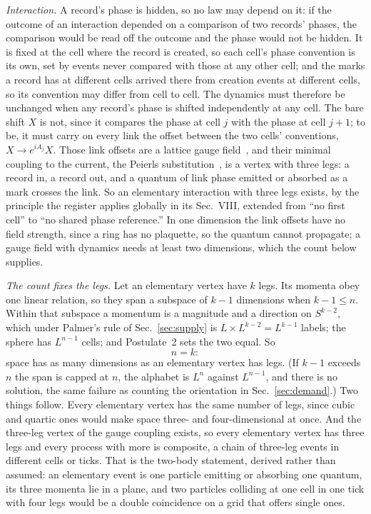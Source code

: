 \documentclass[aps,prd,twocolumn,superscriptaddress,nofootinbib]{revtex4-2}
\begin{document}
\textit{Interaction.} A record's phase is hidden, so no law may depend on it: if the outcome of an interaction depended on a comparison of two records' phases, the comparison would be read off the outcome and the phase would not be hidden. It is fixed at the cell where the record is created, so each cell's phase convention is its own, set by events never compared with those at any other cell; and the marks a record has at different cells arrived there from creation events at different cells, so its convention may differ from cell to cell. The dynamics must therefore be unchanged when any record's phase is shifted independently at any cell. The bare shift $X$ is not, since it compares the phase at cell $j$ with the phase at cell $j+1$; to be, it must carry on every link the offset between the two cells' conventions, $X \to e^{iA_j}X$. Those link offsets are a lattice gauge field~\cite{wilson1974}, and their minimal coupling to the current, the Peierls substitution~\cite{peierls1933}, is a vertex with three legs: a record in, a record out, and a quantum of link phase emitted or absorbed as a mark crosses the link. So an elementary interaction with three legs exists, by the principle the register applies globally in its Sec.~VIII, extended from ``no first cell'' to ``no shared phase reference.'' In one dimension the link offsets have no field strength, since a ring has no plaquette, so the quantum cannot propagate; a gauge field with dynamics needs at least two dimensions, which the count below supplies.

\textit{The count fixes the legs.} Let an elementary vertex have $k$ legs. Its momenta obey one linear relation, so they span a subspace of $k-1$ dimensions when $k-1 \le n$. Within that subspace a momentum is a magnitude and a direction on $S^{k-2}$, which under Palmer's rule of Sec.~\ref{sec:supply} is $L\times L^{k-2} = L^{k-1}$ labels; the sphere has $L^{n-1}$ cells; and Postulate~2 sets the two equal. So
\begin{equation}
n = k :
\label{eq:nk}
\end{equation}
space has as many dimensions as an elementary vertex has legs. (If $k-1$ exceeds $n$ the span is capped at $n$, the alphabet is $L^n$ against $L^{n-1}$, and there is no solution, the same failure as counting the orientation in Sec.~\ref{sec:demand}.) Two things follow. Every elementary vertex has the same number of legs, since cubic and quartic ones would make space three- and four-dimensional at once. And the three-leg vertex of the gauge coupling exists, so every elementary vertex has three legs and every process with more is composite, a chain of three-leg events in different cells or ticks. That is the two-body statement, derived rather than assumed: an elementary event is one particle emitting or absorbing one quantum, its three momenta lie in a plane, and two particles colliding at one cell in one tick with four legs would be a double coincidence on a grid that offers single ones.
\end{document}
